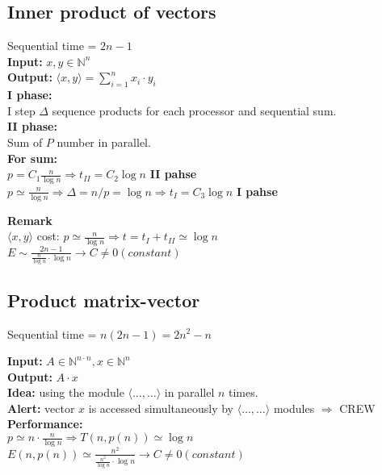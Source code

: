 \subsection{Inner product of vectors}

Sequential time = $2n - 1$\\

\textbf{Input:} $x,y \in \mathbb{N}^n$\\
\textbf{Output:} $\langle x,y \rangle = \sum_{i=1}^{n}{x_i \cdot y_i}$\\

\textbf{I phase:}\\
I step $\Delta$ sequence products for each processor and sequential sum.\\
\textbf{II phase:}\\
Sum of $P$ number in parallel.\\

\textbf{For sum:}\\
$p = C_1 \frac{n}{\log{n}} \Rightarrow  t_{II} = C_2 \log{n}$ \textbf{II pahse} \\
$p \simeq \frac{n}{\log{n}} \Rightarrow \Delta = n/p = \log{n} \Rightarrow t_I = C_3 \log{n}$ \textbf{I pahse}

\textbf{Remark}\\
$\langle x,y \rangle$ cost: $p \simeq \frac{n}{\log{n}} \Rightarrow t = t_I + t_{II} \simeq \log{n}$\\
$E \sim \frac{2n-1}{\frac{n}{\log{n}} \cdot \log{n}} \rightarrow C \neq 0 (constant)$

\subsection{Product matrix-vector}

Sequential time = $n(2n-1) = 2n^2 - n$

\textbf{Input:} $A \in \mathbb{N}^{n \cdot n}, x \in \mathbb{N}^{n}$\\
\textbf{Output:} $A \cdot x$\\
\textbf{Idea:} using the module $\langle \dots,\dots \rangle$ in parallel $n$ times.\\
\textbf{Alert:} vector $x$ is accessed simultaneously by $\langle \dots,\dots \rangle$ modules $\Rightarrow$ CREW\\

\textbf{Performance:}\\
$p \simeq n \cdot \frac{n}{\log{n}} \Rightarrow T(n, p(n)) \simeq \log{n}$\\
$E(n,p(n)) \simeq  \frac{n^2}{\frac{n^2}{\log{n}} \cdot \log{n}} \rightarrow C \neq 0 (constant)$

